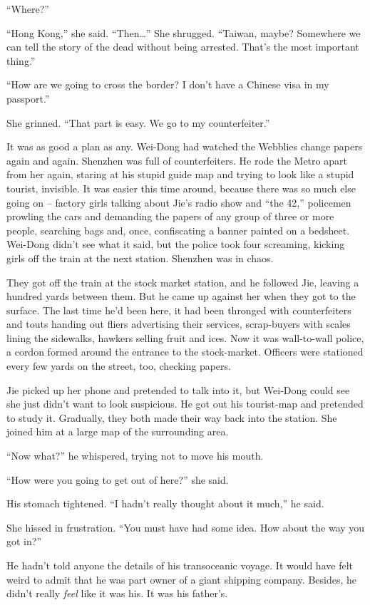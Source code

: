 ``Where?''

``Hong Kong,'' she said. ``Then\ldots{}'' She shrugged. ``Taiwan, maybe?
Somewhere we can tell the story of the dead without being arrested.
That's the most important thing.''

``How are we going to cross the border? I don't have a Chinese visa
in my passport.''

She grinned. ``That part is easy. We go to my counterfeiter.''

It was as good a plan as any. Wei-Dong had watched the Webblies
change papers again and again. Shenzhen was full of counterfeiters.
He rode the Metro apart from her again, staring at his stupid guide
map and trying to look like a stupid tourist, invisible. It was
easier this time around, because there was so much else going on --
factory girls talking about Jie's radio show and ``the 42,''
policemen prowling the cars and demanding the papers of any group
of three or more people, searching bags and, once, confiscating a
banner painted on a bedsheet. Wei-Dong didn't see what it said, but
the police took four screaming, kicking girls off the train at the
next station. Shenzhen was in chaos.

They got off the train at the stock market station, and he followed
Jie, leaving a hundred yards between them. But he came up against
her when they got to the surface. The last time he'd been here, it
had been thronged with counterfeiters and touts handing out fliers
advertising their services, scrap-buyers with scales lining the
sidewalks, hawkers selling fruit and ices. Now it was wall-to-wall
police, a cordon formed around the entrance to the stock-market.
Officers were stationed every few yards on the street, too,
checking papers.

Jie picked up her phone and pretended to talk into it, but Wei-Dong
could see she just didn't want to look suspicious. He got out his
tourist-map and pretended to study it. Gradually, they both made
their way back into the station. She joined him at a large map of
the surrounding area.

``Now what?'' he whispered, trying not to move his mouth.

``How were you going to get out of here?'' she said.

His stomach tightened. ``I hadn't really thought about it much,'' he
said.

She hissed in frustration. ``You must have had some idea. How about
the way you got in?''

He hadn't told anyone the details of his transoceanic voyage. It
would have felt weird to admit that he was part owner of a giant
shipping company. Besides, he didn't really \emph{feel} like it was
his. It was his father's.

